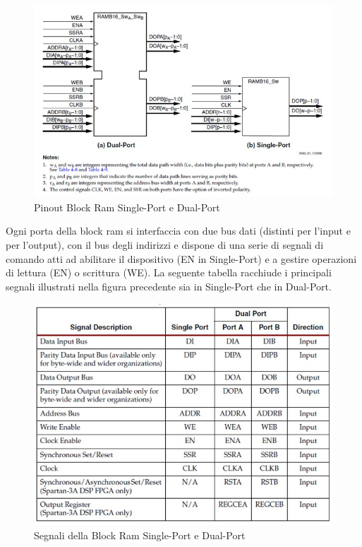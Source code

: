 \begin{figure}[!h]
\centering
\includegraphics[width=\textwidth]{img/blockRam/pinoutPorte.jpg}
\caption{Pinout Block Ram Single-Port e Dual-Port}
\label{fig:set_ass}
\end{figure}


Ogni  porta della block ram si interfaccia con due bus dati (distinti per l'input e per l'output),  con il bus degli indirizzi e dispone di una serie di segnali di comando atti ad abilitare il dispositivo (EN in Single-Port) e a gestire operazioni di lettura (EN) o scrittura (WE). La seguente tabella racchiude i principali segnali illustrati nella figura precedente sia in Single-Port che in Dual-Port.

\begin{figure}[!h]
\centering
\includegraphics[width=\textwidth]{img/blockRam/segnali.jpg}
\caption{Segnali della Block Ram Single-Port e Dual-Port}
\label{fig:set_ass}
\end{figure}

